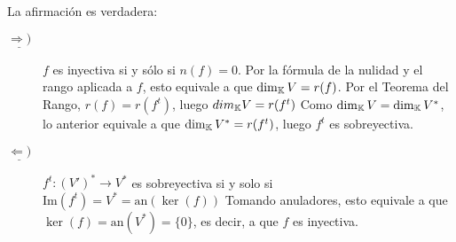 \documentclass[12pt]{article}
\begin{document}
\begin{ejercicio}
\begin{enumerate}[label=(\alph*)]
            La afirmación es verdadera:
            \begin{description}
                \item[$\underline{\Rightarrow)}$] 
                $f$ es inyectiva si y sólo si $n(f) = 0.$ Por la fórmula de la nulidad y el rango aplicada a $f$, esto equivale a que $\dim_{\mathbb{K}} V = r(f)$. Por el Teorema del Rango, $r(f) = r(f^t)$, luego $dim_{\mathbb{K}} V = r(f^t)$ Como $\dim_{\mathbb{K}} V = \dim_{\mathbb{K}} V^*$, lo anterior equivale a que $\dim_{\mathbb{K}} V^* = r(f^t)$, luego $f^t$ es sobreyectiva.

                \item[$\underline{\Leftarrow)}$]
                $f^t: (V')^* \rightarrow V^*$ es sobreyectiva si y solo si $\text{Im}(f^t) = V^* = \text{an}(\ker(f))$ Tomando anuladores, esto equivale a que $\ker(f) = \text{an}(V^*) = \{0\}$, es decir, a que $f$ es inyectiva.
            \end{description}
        \end{enumerate}
    \end{ejercicio}

    
\end{document}
